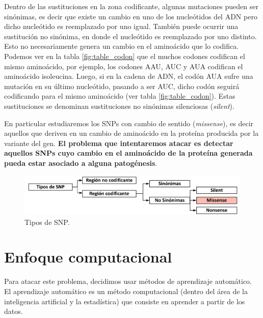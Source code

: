 Dentro de las sustituciones en la zona codificante, algunas mutaciones pueden ser sinónimas, es decir que existe un cambio en uno de los nucleótidos del ADN pero dicho nucleótido es reemplazado por uno igual. También puede ocurrir una sustitución no sinónima, en donde el nucleótido es reemplazado por uno distinto. Esto no necesariamente genera un cambio en el aminoácido que lo codifica. Podemos ver en la tabla \ref{fig:table_codon} que el muchos codones codifican el mismo aminoácido, por ejemplo, los codones AAU, AUC y AUA codifican el aminoácido isoleucina. Luego, si en la cadena de ADN, el codón AUA sufre una mutación en su último nucleótido, pasando a ser AUC, dicho codón seguirá codificando para el mismo aminoácido (ver tabla \ref{fig:table_codon}). Estas sustituciones se denominan sustituciones no sinónimas silenciosas (\textit{silent}).

En particular estudiaremos los SNPs con cambio de sentido (\textit{missense}), es decir aquellos que deriven en un cambio de aminoácido en la proteína producida por la variante del gen. \textbf{El problema que intentaremos atacar es detectar aquellos SNPs cuyo cambio en el aminoácido de la proteína generada pueda estar asociado a alguna patogénesis}. 


\begin{figure}[H]
\centering
    \includegraphics[scale=0.55]{documents/latex/figures/1/snp_types.pdf}
    \caption{Tipos de SNP.}
    \label{fig:snp_types}
\end{figure}




\section{Enfoque computacional}

Para atacar este problema, decidimos usar métodos de aprendizaje automático. El aprendizaje automático es un método computacional (dentro del área de la inteligencia artificial y la estadística) que consiste en aprender a partir de los datos. 

